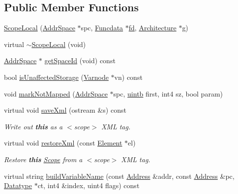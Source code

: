 \subsection*{Public Member Functions}
\begin{DoxyCompactItemize}
\item 
\mbox{\hyperlink{class_scope_local_ac254c3908b456ecd7f2f50ca5a7d3f4d}{Scope\+Local}} (\mbox{\hyperlink{class_addr_space}{Addr\+Space}} $\ast$spc, \mbox{\hyperlink{class_funcdata}{Funcdata}} $\ast$\mbox{\hyperlink{class_scope_a72f6c31e73c46216482a6902d22b3330}{fd}}, \mbox{\hyperlink{class_architecture}{Architecture}} $\ast$g)
\item 
virtual \mbox{\hyperlink{class_scope_local_ad49851b4336a0a5b5e3327018f51b866}{$\sim$\+Scope\+Local}} (void)
\item 
\mbox{\hyperlink{class_addr_space}{Addr\+Space}} $\ast$ \mbox{\hyperlink{class_scope_local_ab1de60987435b80d4a82c5967b163557}{get\+Space\+Id}} (void) const
\item 
bool \mbox{\hyperlink{class_scope_local_ac6913e22130acb08f7d075a136c36780}{is\+Unaffected\+Storage}} (\mbox{\hyperlink{class_varnode}{Varnode}} $\ast$vn) const
\item 
void \mbox{\hyperlink{class_scope_local_a560ea5441b79ef3c17b890c7d37ccaf1}{mark\+Not\+Mapped}} (\mbox{\hyperlink{class_addr_space}{Addr\+Space}} $\ast$spc, \mbox{\hyperlink{types_8h_a2db313c5d32a12b01d26ac9b3bca178f}{uintb}} first, int4 sz, bool param)
\item 
virtual void \mbox{\hyperlink{class_scope_local_a5ce828992aceb086c5bcc62d8cf2f3ae}{save\+Xml}} (ostream \&s) const
\begin{DoxyCompactList}\small\item\em Write out {\bfseries{this}} as a $<$scope$>$ X\+ML tag. \end{DoxyCompactList}\item 
virtual void \mbox{\hyperlink{class_scope_local_a5eeb1756bc706b8d5211fda106ad82ae}{restore\+Xml}} (const \mbox{\hyperlink{class_element}{Element}} $\ast$el)
\begin{DoxyCompactList}\small\item\em Restore {\bfseries{this}} \mbox{\hyperlink{class_scope}{Scope}} from a $<$scope$>$ X\+ML tag. \end{DoxyCompactList}\item 
virtual string \mbox{\hyperlink{class_scope_local_a7c86528490f519a64d44ae6dc8438393}{build\+Variable\+Name}} (const \mbox{\hyperlink{class_address}{Address}} \&addr, const \mbox{\hyperlink{class_address}{Address}} \&pc, \mbox{\hyperlink{class_datatype}{Datatype}} $\ast$ct, int4 \&index, uint4 flags) const

\end{DoxyCompactItemize}
